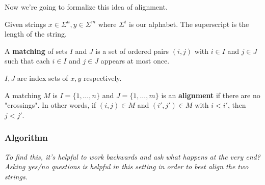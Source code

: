 \documentclass[12pt]{article}
\begin{document}
  Now we're going to formalize this idea of alignment.

   {
    Given strings $x \in \Sigma^n, y \in \Sigma^m$ where $\Sigma^i$ is our
    alphabet. The superscript is the length of the string.

    A {\bf matching} of sets $I$ and $J$ is a set of ordered pairs $(i, j)$ with
    $i \in I$ and $j \in J$ such that each $i \in I$ and $j \in J$ appears at
    most once.

    $I, J$ are index sets of $x, y$ respectively.

    A matching $M$ is $I = \{1, \dots, n\}$ and $J = \{1, \dots, m\}$ is an {\bf
    alignment} if there are no "crossings". In other words, if $(i, j) \in M$
    and $(i', j') \in M$ with $i < i'$, then $j < j'$.

  }


  \subsubsection{Algorithm}

  {\it To find this, it's helpful to work backwards and ask what happens at the
  very end? Asking yes/no questions is helpful in this setting in order to best
  align the two strings.}
\end{document}
